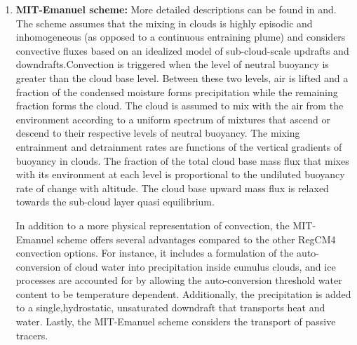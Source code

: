 {\begin{enumerate}
where $\tau$ is the $ABE$ removal time scale.

The fundamental difference between the two assumptions is that the AS74 closure
assumption relates the convective fluxes and rainfall to the tendencies in the
state of the atmosphere, while the FC80 closure assumption relates the
convective fluxes to the degree of instability in the atmosphere. Both schemes
achieve a statistical equilibrium between convection and the large-scale
processes.

A number of parameters present in the scheme can be used to optimize its
performance, and \cite{Giorgi_93c} discusses a wide range of sensitivity
experiments. We found that the parameter to which the scheme is most sensitive
is by and large the fraction of precipitation evaporated in the downdraft
(Peff, with values from 0 to 1), which essentially measures the precipitation
efficiency. Larger values of Peff lead to reduced precipitation.

\item {\bf MIT-Emanuel scheme:} 
More detailed descriptions can be found
in \citet{Emanuel_91} and\citet{Emanuel_99}.  The scheme assumes that the
mixing in clouds is highly episodic and inhomogeneous (as opposed to a
continuous entraining plume) and considers convective fluxes based on
an idealized model of sub-cloud-scale updrafts and downdrafts.Convection is
triggered when the level of neutral buoyancy is greater than the cloud base
level.  Between these two levels, air is lifted and a fraction of the condensed
moisture forms precipitation while the remaining fraction forms the cloud.  The
cloud is assumed to mix with the air from the environment according to a
uniform spectrum of mixtures that ascend or descend to their respective levels
of neutral buoyancy.  The mixing entrainment and detrainment rates are
functions of the vertical gradients of buoyancy in clouds.  The fraction of
the total cloud base mass flux that mixes with its environment at each level
is proportional to the undiluted buoyancy rate of change with altitude.  The
cloud base upward mass flux is relaxed towards the sub-cloud layer quasi
equilibrium.

In addition to a more physical representation of convection, the MIT-Emanuel
scheme offers several advantages compared to the other RegCM4 convection
options.  For instance, it includes a formulation of the auto-conversion of
cloud water into precipitation inside cumulus clouds, and ice processes are
accounted for by allowing the auto-conversion threshold water content to be
temperature dependent.  Additionally, the precipitation is added to a
single,hydrostatic, unsaturated downdraft that transports heat and
water. Lastly, the MIT-Emanuel scheme considers the transport of passive
tracers.


\end{enumerate}}
